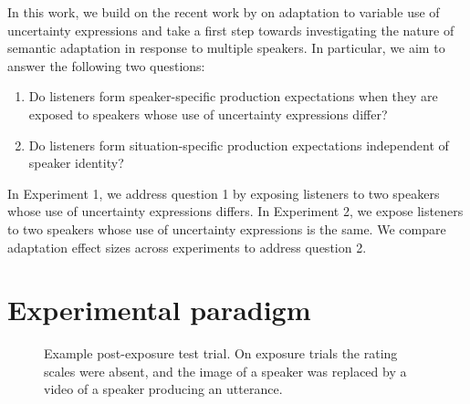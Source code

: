 In this work, we build on the recent work by \textcite{Schuster2018} on 
adaptation to variable use of uncertainty expressions and 
take a first step towards investigating the nature of semantic adaptation 
in response to multiple speakers. 
In particular,
we aim to answer the following two questions:
\begin{enumerate}
    \item Do listeners form speaker-specific production expectations when they are 
             exposed to speakers whose use of uncertainty expressions differ? 
    \item Do listeners form situation-specific production expectations independent of speaker identity?
\end{enumerate}    

In Experiment 1, we address question 1 by exposing listeners to two
speakers whose use of uncertainty expressions differs. In Experiment 2, we expose listeners to two speakers whose use of uncertainty expressions is the same. We compare adaptation effect sizes across experiments to address question 2.

\section{Experimental paradigm}



\begin{figure}
\caption{Example post-exposure test trial. On exposure trials the rating scales were absent, and the image of a speaker was replaced by a video of a speaker producing an utterance.  \label{fig:post-exposure}}
\end{figure}

